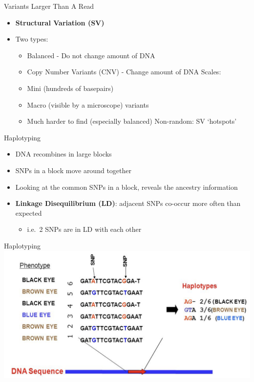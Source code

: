 \documentclass[
  ignorenonframetext,
]{beamer}
\providecommand{\tightlist}{%
  \setlength{\itemsep}{0pt}\setlength{\parskip}{0pt}}
\begin{document}
\begin{frame}{Variants Larger Than A Read}
\label{variants-larger-than-a-read}
\Large

\begin{itemize}
\tightlist
\item
  \textbf{Structural Variation (SV)}
\item
  Two types:

  \begin{itemize}
  \tightlist
  \item
    Balanced - Do not change amount of DNA
  \item
    Copy Number Variants (CNV) - Change amount of DNA Scales:
  \item
    Mini (hundreds of basepairs)
  \item
    Macro (visible by a microscope) variants
  \item
    Much harder to find (especially balanced) Non-random: SV `hotspots'
  \end{itemize}
\end{itemize}
\end{frame}

\begin{frame}{Haplotyping}
\label{haplotyping}
\Large

\begin{itemize}
\tightlist
\item
  DNA recombines in large blocks
\item
  SNPs in a block move around together
\item
  Looking at the common SNPs in a block, reveals the ancestry
  information
\item
  \textbf{Linkage Disequilibrium (LD)}: adjacent SNPs co-occur more
  often than expected

  \begin{itemize}
  \tightlist
  \item
    i.e.~2 SNPs are in LD with each other
  \end{itemize}
\end{itemize}
\end{frame}

\begin{frame}{Haplotyping}
\label{haplotyping-1}
\includegraphics{figs/haplotype.png}
\end{frame}
\end{document}
